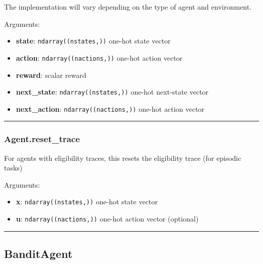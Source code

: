 The implementation will vary depending on the type of agent and
environment.

Arguments:

\begin{itemize}
\tightlist
\item
  \textbf{state}: \texttt{ndarray((nstates,))} one-hot state vector
\item
  \textbf{action}: \texttt{ndarray((nactions,))} one-hot action vector
\item
  \textbf{reward}: scalar reward
\item
  \textbf{next\_state}: \texttt{ndarray((nstates,))} one-hot next-state
  vector
\item
  \textbf{next\_action}: \texttt{ndarray((nactions,))} one-hot action
  vector
\end{itemize}

\begin{center}\rule{0.5\linewidth}{\linethickness}\end{center}

\hypertarget{agent.reset_trace}{%
\subsubsection{Agent.reset\_trace}\label{agent.reset_trace}}

\begin{Shaded}
\begin{Highlighting}[]
\OperatorTok{=}\NormalTok{)}
\end{Highlighting}
\end{Shaded}

For agents with eligibility traces, this resets the eligibility trace
(for episodic tasks)

Arguments:

\begin{itemize}
\tightlist
\item
  \textbf{x}: \texttt{ndarray((nstates,))} one-hot state vector
\item
  \textbf{u}: \texttt{ndarray((nactions,))} one-hot action vector
  (optional)
\end{itemize}

\begin{center}\rule{0.5\linewidth}{\linethickness}\end{center}

\hypertarget{banditagent}{%
\subsection{BanditAgent}\label{banditagent}}

